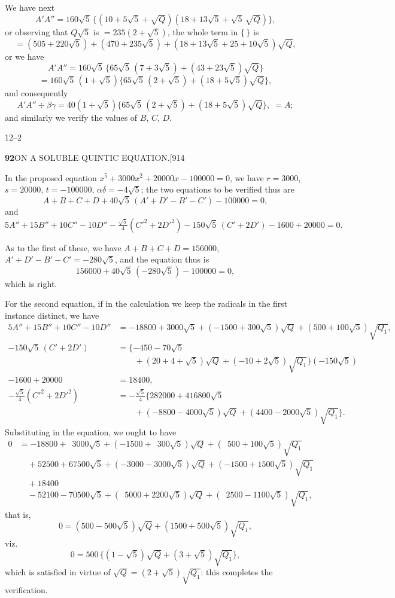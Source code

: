 \documentclass[11pt]{article}
\begin{document}
\hspace{1em} We have next
\[
A'A''=160\sqrt{5}\,\{(10+5\sqrt{5}+\sqrt{Q})(18+13\sqrt{5}+\sqrt{5}\,\sqrt{Q})\},
\]
or observing that $Q\sqrt{5}$ is $=235(2+\sqrt{5})$, the whole term in
$\{\,\}$ is
\[
=(505+220\sqrt{5})+(470+235\sqrt{5})+(18+13\sqrt{5}+25+10\sqrt{5})\sqrt{Q},
\]
or we have
\[
A'A''=160\sqrt{5}\,\{65\sqrt{5}\,(7+3\sqrt{5})+(43+23\sqrt{5})\sqrt{Q}\}
\]
\[
=160\sqrt{5}\,(1+\sqrt{5})\{65\sqrt{5}\,(2+\sqrt{5})+(18+5\sqrt{5})\sqrt{Q}\},
\]
and consequently
\[
A'A''\div\beta\gamma=40(1+\sqrt{5})\{65\sqrt{5}\,(2+\sqrt{5})+(18+5\sqrt{5})\sqrt{Q}\},\;=A;
\]
and similarly we verify the values of $B$, $C$, $D$.

\hfill 12--2

\newpage
\noindent\textbf{92}\hfill ON A SOLUBLE QUINTIC EQUATION.\hfill[914

\smallskip
\hspace{1em} In the proposed equation $x^{5}+3000x^{2}+20000x-100000=0$, we
have $r=3000$, $s=20000$, $t=-100000$, $\alpha\delta=-4\sqrt{5}$; the two
equations to be verified thus are
\[
A+B+C+D+40\sqrt{5}\,(A'+D'-B'-C')-100000=0,
\]
and
\[
5A''+15B''+10C''-10D''-\tfrac{\sqrt{5}}{4}(C'^{2}+2D'^{2})-150\sqrt{5}\,(C'+2D')-1600+20000=0.
\]

As to the first of these, we have $A+B+C+D=156000$,
$A'+D'-B'-C'=-280\sqrt{5}$, and the equation thus is
\[
156000+40\sqrt{5}\,(-280\sqrt{5})-100000=0,
\]
which is right.

\hspace{1em} For the second equation, if in the calculation we keep the
radicals in the first instance distinct, we have
\begin{align*}
5A''+15B''+10C''-10D'' &= -18800+3000\sqrt{5}+(-1500+300\sqrt{5})\sqrt{Q}+(500+100\sqrt{5})\sqrt{Q_{1}},\\
-150\sqrt{5}\,(C'+2D') &= \{-450-70\sqrt{5}\\
&\qquad +(20+4+\sqrt{5})\sqrt{Q}+(-10+2\sqrt{5})\sqrt{Q_{1}}\}(-150\sqrt{5})\\
-1600+20000 &= 18400,\\
-\tfrac{\sqrt{5}}{4}(C'^{2}+2D'^{2}) &= -\tfrac{\sqrt{5}}{4}\{282000+416800\sqrt{5}\\
&\qquad +(-8800-4000\sqrt{5})\sqrt{Q}+(4400-2000\sqrt{5})\sqrt{Q_{1}}\}.
\end{align*}
Substituting in the equation, we ought to have
\begin{align*}
0 &= -18800+\phantom{0}3000\sqrt{5}+(-1500+\phantom{0}300\sqrt{5})\sqrt{Q}+(\phantom{0}500+100\sqrt{5})\sqrt{Q_{1}}\\
&\quad +52500+67500\sqrt{5}+(-3000-3000\sqrt{5})\sqrt{Q}+(-1500+1500\sqrt{5})\sqrt{Q_{1}}\\
&\quad +18400\\
&\quad -52100-70500\sqrt{5}+(\phantom{0}5000+2200\sqrt{5})\sqrt{Q}+(\phantom{0}2500-1100\sqrt{5})\sqrt{Q_{1}},
\end{align*}
that is,
\[
0=(500-500\sqrt{5})\sqrt{Q}+(1500+500\sqrt{5})\sqrt{Q_{1}},
\]
viz.
\[
0=500\,\{(1-\sqrt{5})\sqrt{Q}+(3+\sqrt{5})\sqrt{Q_{1}}\},
\]
which is satisfied in virtue of $\sqrt{Q}=(2+\sqrt{5})\sqrt{Q_{1}}$: this
completes the verification.
\end{document}
